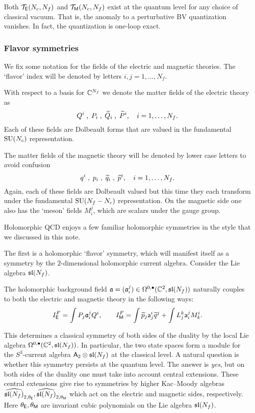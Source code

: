 \documentclass[11pt]{amsart}
\def\SU{{\rm SU}}
\def\sfa{\mathsf{a}}
\begin{document}
\begin{thm}
Both $\cT_{\sfE}(N_c, N_f)$ and $\cT_{\sfM}(N_c, N_f)$ exist at the quantum level for any choice of classical vacuum. 
That is, the anomaly to a perturbative BV quantization vanishes.
In fact, the quantization is one-loop exact. 
\end{thm}


\subsubsection{Flavor symmetries}

We fix some notation for the fields of the electric and magnetic theories. 
The `flavor' index will be denoted by letters $i,j=1,\ldots, N_f$. 

With respect to a basis for $\CC^{N_f}$ we denote the matter fields of the electric theory as
\[
Q^i\; , \; P_i \; , \; \Tilde{Q}_i \; , \; \Tilde{P}^i , \quad i = 1, \ldots, N_f.
\]
Each of these fields are Dolbeault forms that are valued in the fundamental $\SU(N_c)$ representation. 

The matter fields of the magnetic theory will be denoted by lower case letters to avoid confusion
\[
q^i\; , \; p_i \; , \; \Tilde{q}_i \; , \; \Tilde{p}^i , \quad i = 1, \ldots, N_f.
\]
Again, each of these fields are Dolbeault valued but this time they each transform under the fundamental $\SU(N_f-N_c)$ representation. 
On the magnetic side one also has the `meson' fields $M_{i}^j$, which are scalars under the gauge group.

Holomorphic QCD enjoys a few familiar holomorphic symmetries in the style that we discussed in this note.

The first is a holomorphic `flavor' symmetry, which will manifest itself as a symmetry by the $2$-dimensional holomorphic current algebra. 
Consider the Lie algebra $\sl(N_f)$. 

The holomorphic background field $\fa = (\fa_i^j) \in \Omega^{0,\bu}(\CC^2 , \sl(N_f))$ naturally couples to both the electric and magnetic theory in the following ways:
\[
I^F_\sfE = \int P_j \fa_i^j Q^i , \qquad I^F_\sfM = \int \Tilde{p}_j \sfa_j^i \Tilde{q}^j + \int L^k_j \sfa_i^j M^i_k . 
\]

This determines a classical symmetry of both sides of the duality by the local Lie algebra $\Omega^{0,\bu}(\CC^2, \sl(N_f))$. 
In particular, the two state spaces form a module for the $S^3$-current algebra $\sfA_2 \otimes \sl(N_f)$ at the classical level.
A natural question is whether this symmetry persists at the quantum level. 
The answer is {\em yes}, but on both sides of the duality one must take into account central extensions.
These central extensions give rise to symmetries by higher Kac--Moody algebras $\Hat{\sl(N_f)}_{2,\theta_{\sfE}}, \Hat{\sl(N_f)}_{2,\theta_{\sfM}}$ which act on the electric and magnetic sides, respectively.
Here $\theta_\sfE, \theta_\sfM$ are invariant cubic polynomials on the Lie algebra $\sl(N_f)$. 
\end{document}
